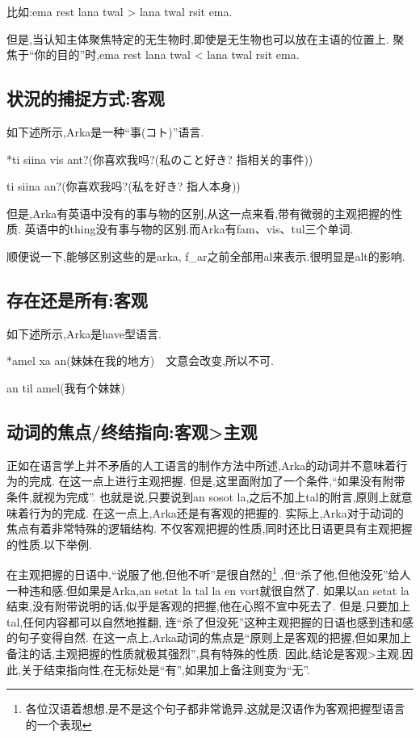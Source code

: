 比如:\quad ema rest lana twal > lana twal rsit ema.

但是,当认知主体聚焦特定的无生物时,即使是无生物也可以放在主语的位置上.
聚焦于“你的目的”时,ema rest lana twal < lana twal rsit ema.

\subsection{状況的捕捉方式:客观}

如下述所示,Arka是一种``事(コト)''语言.

*ti siina vis ant?(你喜欢我吗?(私のこと好き? 指相关的事件))

ti siina an?(你喜欢我吗?(私を好き? 指人本身))

但是,Arka有英语中没有的事与物的区别,从这一点来看,带有微弱的主观把握的性质.
英语中的thing没有事与物的区别.而Arka有fam、vis、tul三个单词.

顺便说一下,能够区别这些的是arka, f\_ar之前全部用al来表示.很明显是alt的影响.

\subsection{存在还是所有:客观}

如下述所示,Arka是have型语言.

*amel xa an(妹妹在我的地方)　文意会改变,所以不可.

an til amel(我有个妹妹)

\subsection{动词的焦点/终结指向:客观>主观}

正如在语言学上并不矛盾的人工语言的制作方法中所述,Arka的动词并不意味着行为的完成.
在这一点上进行主观把握.
但是,这里面附加了一个条件,“如果没有附带条件,就视为完成”.
也就是说,只要说到an sosot la,之后不加上tal的附言,原则上就意味着行为的完成.
在这一点上,Arka还是有客观的把握的.
实际上,Arka对于动词的焦点有着非常特殊的逻辑结构.
不仅客观把握的性质,同时还比日语更具有主观把握的性质.以下举例.

在主观把握的日语中,“说服了他,但他不听”是很自然的\footnote{各位汉语着想想,是不是这个句子都非常诡异,这就是汉语作为客观把握型语言的一个表现}
,但“杀了他,但他没死”给人一种违和感.但如果是Arka,an setat la tal la en vort就很自然了.
如果以an setat la结束,没有附带说明的话,似乎是客观的把握,他在心照不宣中死去了.
但是,只要加上tal,任何内容都可以自然地推翻,
连“杀了但没死”这种主观把握的日语也感到违和感的句子变得自然.
在这一点上,Arka动词的焦点是“原则上是客观的把握,但如果加上备注的话,主观把握的性质就极其强烈”,具有特殊的性质.
因此,结论是客观>主观.因此,关于结束指向性,在无标处是“有”,如果加上备注则变为“无”.

